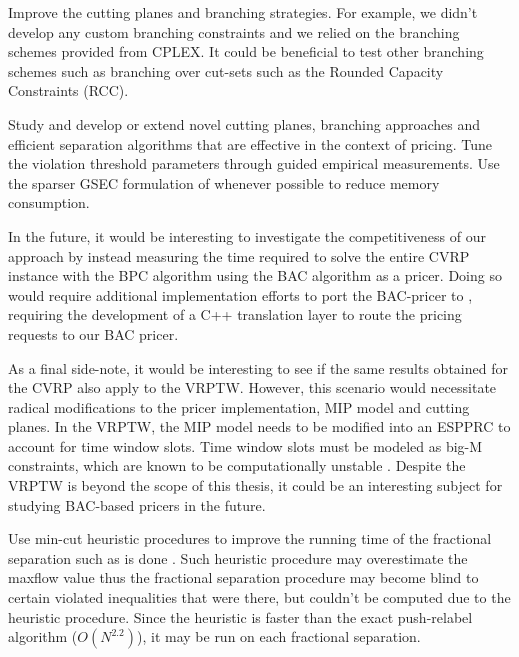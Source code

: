 Improve the cutting planes and branching strategies.
For example, we didn't develop any custom branching constraints and we relied on the branching schemes provided from CPLEX.
It could be beneficial to test other branching schemes such as branching over cut-sets such as the Rounded Capacity Constraints (RCC).

Study and develop or extend novel cutting planes, branching approaches and efficient separation algorithms that are effective in the context of pricing.
Tune the violation threshold parameters through guided empirical measurements.
Use the sparser GSEC formulation of  whenever possible to reduce memory consumption.

\medskip

In the future, it would be interesting to investigate the competitiveness of our approach by instead measuring the time required to solve the entire CVRP instance with the BPC algorithm using the BAC algorithm as a pricer.
Doing so would require additional implementation efforts to port the BAC-pricer to \bapcod{}, requiring the development of a C++ translation layer to route the \bapcod{} pricing requests to our BAC pricer.

As a final side-note, it would be interesting to see if the same results obtained for the CVRP also apply to the VRPTW.
However, this scenario would necessitate radical modifications to the pricer implementation, MIP model and cutting planes.
In the VRPTW, the MIP model needs to be modified into an ESPPRC to account for time window slots.
Time window slots must be modeled as big-M constraints, which are known to be computationally unstable \parencite{jepsen2008branchandcut}.
Despite the VRPTW is beyond the scope of this thesis, it could be an interesting subject for studying BAC-based pricers in the future.




Use min-cut heuristic procedures to improve the running time of the fractional separation such as is done \textcite{kernighan1970}.
Such heuristic procedure may overestimate the maxflow value thus the fractional separation procedure may become blind to certain violated inequalities that were there, but couldn't be computed due to the heuristic procedure.
Since the heuristic is faster than the exact push-relabel algorithm ($O(N^{2.2})$), it may be run on each fractional separation.

